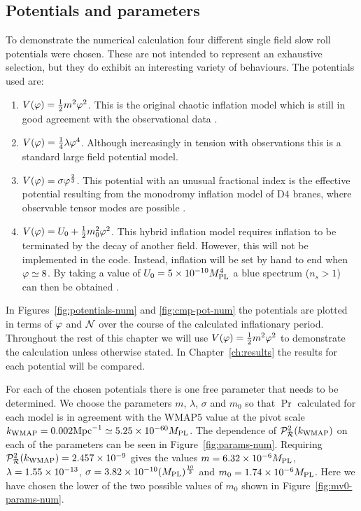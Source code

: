 \subsection{Potentials and parameters}
\label{sec:pots-num}
To demonstrate the numerical calculation four different single field slow roll
potentials were chosen. These are not intended to represent an exhaustive selection,
but they do exhibit an interesting variety of behaviours. The potentials used are:
% 
% 
\begin{enumerate}
% 
 \item $V(\varphi) = \frac{1}{2} m^2 \varphi^2$. This is the original chaotic inflation model which is
still in good agreement with the observational data \cite{Alabidi:2008ej}.
% 
 \item $V(\varphi) = \frac{1}{4}\lambda\varphi^4$. Although increasingly in tension with observations
 this is a standard large field potential model.
% 
 \item $V(\varphi) = \sigma\varphi^{\frac{2}{3}}$. This potential with an unusual fractional index
is the effective potential resulting from the monodromy inflation model of D$4$
branes, where observable tensor modes are possible \cite{Silverstein:2008sg,
Alabidi:2008ej}.
% 
 \item $V(\varphi) = U_0 + \frac{1}{2} m_0^2 \varphi^2$. This hybrid inflation model requires inflation to
be terminated by the decay of another field. However, this will not be
implemented in the code. Instead,
inflation will be set by hand to end when $\varphi \simeq 8$. By taking a value of
$U_0 = 5\times 10^{-10}M_{\mathrm{PL}}^{4}$ a blue spectrum ($n_s>1$) can then be obtained
\cite{Linde:1993cn,Komatsu:2008hk}.
% 
\end{enumerate}
% 
% 
In Figures~\ref{fig:potentials-num} and \ref{fig:cmp-pot-num} the potentials are
plotted in terms of $\varphi$ and $\mathcal{N}$ over the course of the calculated inflationary
period. Throughout the rest of this chapter we will use $V(\varphi)=\frac{1}{2} m^2 \varphi^2$ to
demonstrate the calculation unless otherwise stated. In Chapter~\ref{ch:results} the
results for each potential will be compared.

For each of the chosen potentials there is one free parameter that needs to be
determined.
We choose the parameters $m$, $\lambda$, $\sigma$ and $m_0$ so that $\Pr$ calculated
for each model is in agreement with the
WMAP5 value at the pivot scale
$k_\mathrm{WMAP}=0.002\mathrm{Mpc}^{-1} \simeq5.25\times10^{- 60} M_{\mathrm{PL}}$. 
The dependence of $\mathcal{P}_{\mathcal{R}}^2 (k_\mathrm{WMAP})$ on each of the parameters can be seen in
Figure~\ref{fig:params-num}.
Requiring $\mathcal{P}_{\mathcal{R}}^2 (k_\mathrm{WMAP})=2.457\times 10^{-9}$
gives the values $m=6.32\times 10^{-6}M_{\mathrm{PL}}$, $\lambda=1.55\times 10^{-13}$, $\sigma= 3.82\times 10^{-10}
(M_{\mathrm{PL}})^{\frac{10}{3}}$ and $m_0=1.74\times 10^{-6}M_{\mathrm{PL}}$. Here we have chosen the lower of
the two possible values of $m_0$ shown in Figure~\ref{fig:mv0-params-num}.

